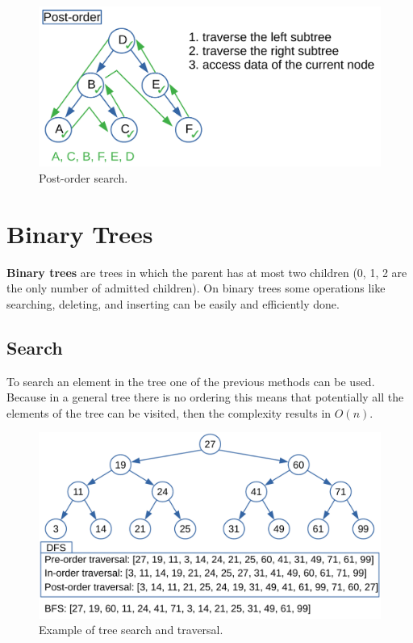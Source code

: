 \begin{figure}[H]
	\begin{center}
		\includegraphics[scale=.6]{chapters/trees/images/trees_7.pdf}
		\caption[Post-order search.]{Post-order search.}
		\label{trees_7}
	\end{center}
\end{figure}

\section{Binary Trees}
\textbf{Binary trees} are trees in which the parent has at most two children (0, 1, 2 are the only number of admitted children). On binary trees some operations like searching, deleting, and inserting can be easily and efficiently done. 
\subsection{Search}
To search an element in the tree one of the previous methods can be used. Because in a general tree there is no ordering this means that potentially all the elements of the tree can be visited, then the complexity results in \(O(n)\).

\begin{figure}[H]
	\begin{center}
		\includegraphics[scale=.6]{chapters/trees/images/trees_12.pdf}
		\caption[Example of tree search and traversal.]{Example of tree search and traversal.}
		\label{trees_12}
	\end{center}
\end{figure}

